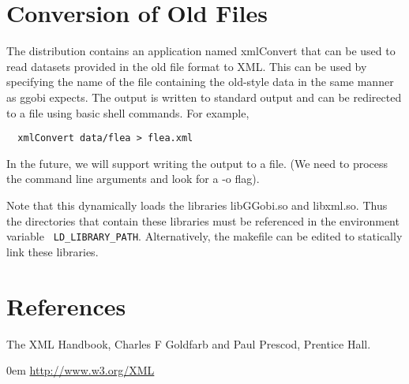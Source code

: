 \documentclass{article}
\def\strip#1>{}
\def\Escape#1{\def\next{#1}%
{\frenchspacing\expandafter\strip\meaning\next}}
\def\Env#1{{\gray\texttt{\Escape{#1}}}}
\begin{document}
\section{Conversion of Old Files}
The distribution contains an application named xmlConvert that can be
used to read datasets provided in the old file format to XML.  This
can be used by specifying the name of the file containing the
old-style data in the same manner as ggobi expects.
The output is written to standard output
and can be redirected to a file using basic shell commands.
For example,
\begin{verbatim}
  xmlConvert data/flea > flea.xml
\end{verbatim}
In the future, we will support writing the output to a file. (We need
to process the command line arguments and look for a -o flag).

Note that this dynamically loads the libraries libGGobi.so and
libxml.so.  Thus the directories that contain these libraries must be
referenced in the environment variable 
\Env{LD_LIBRARY_PATH}.
Alternatively, the makefile can be edited to statically link these
libraries.

\begin{comment}
\section{Compilation}
To activate the XML mechanism, define the variable
\Env{USE_XML} in  local.config.

When we use autoconf, this can be done by
\begin{verbatim}
  ./configure --with-xml
\end{verbatim}

This requires the XML parsing library libxml (also know as gnome-xml)
by Daniel Veillard.  (\texttt{Daniel.Veillard@w3.org}).  See
\Escape{http://xmlsoft.org}
\end{comment}


\section{References}
The XML Handbook, Charles F Goldfarb and Paul Prescod,
 Prentice Hall.

\vspace{1em} \parindent 0em
\url{http://www.w3.org/XML}
\end{document}
